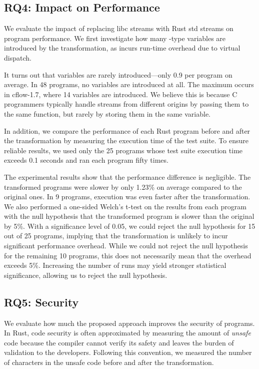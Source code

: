 \subsection{RQ4: Impact on Performance}
\label{sec:evaluation:performance}

We evaluate the impact of replacing libc streams with Rust std streams on
program performance.
%
We first investigate how many -type variables are introduced by the
transformation, as  incurs run-time overhead due to virtual dispatch.

It turns out that  variables are rarely introduced---only 0.9 per program
on average.
%
In 48 programs, no  variables are introduced at all.
%
The maximum occurs in cflow-1.7, where 14  variables are introduced.
%
We believe this is because C programmers typically handle streams from different
origins by passing them to the same function, but rarely by storing them in the
same variable.

In addition, we compare the performance of each Rust program before and after
the transformation by measuring the execution time of the test suite.
%
To ensure reliable results, we used only the 25 programs whose test suite
execution time exceeds 0.1 seconds and ran each program fifty times.

The experimental results show that the performance difference is negligible.
%
The transformed programs were slower by only 1.23\% on average compared to the
original ones.
%
In 9 programs, execution was even faster after the transformation.
%
We also performed a one-sided Welch's t-test on the results from each program
with the null hypothesis that the transformed program is slower than the
original by 5\%.
%
With a significance level of 0.05, we could reject the null hypothesis for 15
out of 25 programs, implying that the transformation is unlikely to incur
significant performance overhead.
%
While we could not reject the null hypothesis for the remaining 10 programs,
this does not necessarily mean that the overhead exceeds 5\%.
%
Increasing the number of runs may yield stronger statistical significance,
allowing us to reject the null hypothesis.

\subsection{RQ5: Security}
\label{sec:evaluation:security}

We evaluate how much the proposed approach improves the security of programs.
%
In Rust, code security is often approximated by measuring the amount of
\emph{unsafe} code because the compiler cannot verify its safety and leaves the
burden of validation to the developers.
%
Following this convention, we measured the number of characters in the unsafe
code before and after the transformation.

